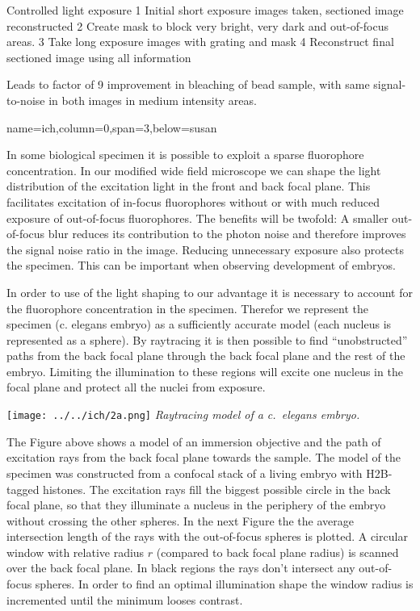 \documentclass[portrait,final]{baposter}
\begin{document}
\begin{poster}
{\begin{multicols}{3}
   Controlled light exposure
   1 Initial short exposure images taken, sectioned image reconstructed
   2 Create mask to block very bright, very dark and out-of-focus areas.
   3 Take long exposure images with grating and mask
   4 Reconstruct final sectioned image using all  information
  
   Leads to factor of 9 improvement in bleaching of bead sample, with
   same signal-to-noise in both images in medium intensity areas.
\end{multicols}
  }
{name=ich,column=0,span=3,below=susan}{
  {}
\begin{multicols}{3}
  In some biological specimen it is possible to exploit a sparse
  fluorophore concentration. In our modified wide field microscope we
  can shape the light distribution of the excitation light in the
  front and back focal plane. This facilitates excitation of in-focus
  fluorophores without or with much reduced exposure of out-of-focus
  fluorophores. The benefits will be twofold: A smaller out-of-focus
  blur reduces its contribution to the photon noise and therefore
  improves the signal noise ratio in the image. Reducing unnecessary
  exposure also protects the specimen. This can be important when
  observing development of embryos.

  In order to use of the light shaping to our advantage it is
  necessary to account for the fluorophore concentration in the
  specimen. Therefor we represent the specimen (c. elegans embryo) as
  a sufficiently accurate model (each nucleus is represented as a
  sphere).  By raytracing it is then possible to find ``unobstructed''
  paths from the back focal plane through the back focal plane and the
  rest of the embryo. Limiting the illumination to these regions will
  excite one nucleus in the focal plane and protect all the nuclei
  from exposure.


  \texttt{[image: ../../ich/2a.png]}
  \emph{Raytracing model of a c.~elegans embryo.}
 

  The Figure above shows a model of an immersion objective and the
  path of excitation rays from the back focal plane towards the
  sample. The model of the specimen was constructed from a confocal
  stack of a living embryo with H2B-tagged histones. The excitation
  rays fill the biggest possible circle in the back focal plane, so
  that they illuminate a nucleus in the periphery of the embryo
  without crossing the other spheres. In the next Figure the the
  average intersection length of the rays with the out-of-focus
  spheres is plotted. A circular window with relative radius $r$
  (compared to back focal plane radius) is scanned over the back focal
  plane. In black regions the rays don't intersect any out-of-focus
  spheres. In order to find an optimal illumination shape the window
  radius is incremented until the minimum looses contrast.
  

\end{multicols}}
\end{poster}
\end{document}
